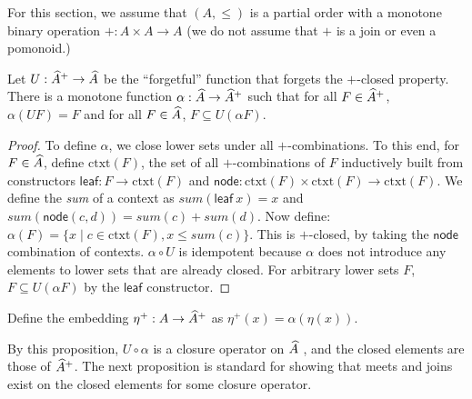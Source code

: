 For this section, we assume that $(A, \leq)$ is a partial order with a
monotone binary operation $+ : A \times A \to A$ (we do not assume
that $+$ is a join or even a pomonoid.)


\begin{proposition}
  Let $U : \widehat{A}^+ \to \widehat{A}$ be the ``forgetful''
  function that forgets the $+$-closed property. There is a monotone
  function $\alpha : \widehat{A} \to \widehat{A}^+$ such that
  for all $F \in \widehat{A}^+$, $\alpha(U F) = F$ and for all
  $F \in \widehat{A}$, $F \subseteq U (\alpha F)$.
\end{proposition}

\begin{proof}
  To define $\alpha$, we close lower sets under all
  $+$-combinations. To this end, for $F \in \widehat{A}$, define
  $\mathrm{ctxt}(F)$, the set of all $+$-combinations of $F$
  inductively built from constructors
  $\mathsf{leaf} : F \to \mathrm{ctxt}(F)$ and
  $\mathsf{node} : \mathrm{ctxt}(F) \times \mathrm{ctxt}(F) \to
    \mathrm{ctxt}(F)$. We define the \emph{sum} of a context as
  $\mathit{sum}(\mathsf{leaf}~x) = x$ and
  $\mathit{sum}(\mathsf{node}(c,d)) = \mathit{sum}(c) +
    \mathit{sum}(d)$. Now define:
  $\alpha(F) = \{ x \mid c \in \mathrm{ctxt}(F), x \leq
    \mathit{sum}(c) \}$. This is $+$-closed, by taking the
  $\mathsf{node}$ combination of contexts. $\alpha \circ U$ is
  idempotent because $\alpha$ does not introduce any elements to lower
  sets that are already closed. For arbitrary lower sets $F$,
  $F \subseteq U(\alpha F)$ by the $\mathsf{leaf}$ constructor.
\end{proof}

\begin{definition}
  Define the embedding $\eta^+ : A \to \widehat{A}^+$ as
  $\eta^+(x) = \alpha(\eta(x))$.
\end{definition}

\begin{remark}
  By this proposition, $U \circ \alpha$ is a closure operator on
  $\widehat{A}$ \cite{Davey_2002}, and the closed elements are
  those of $\widehat{A}^+$. The next proposition is standard for
  showing that meets and joins exist on the closed elements for some
  closure operator.
\end{remark}

